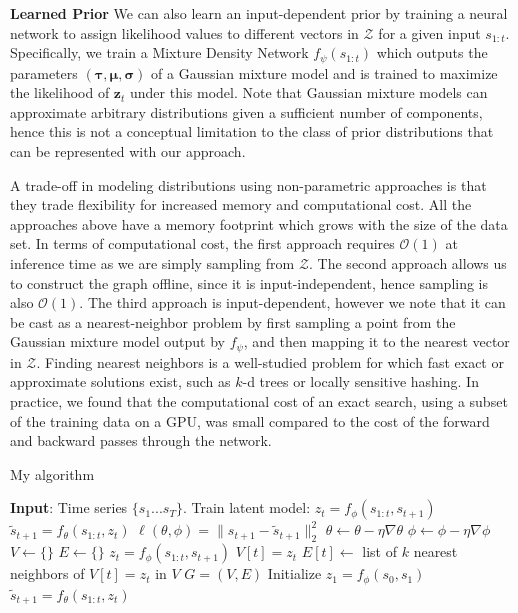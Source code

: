 \documentclass{article}
\begin{document}
\textbf{Learned Prior} \quad
We can also learn an input-dependent prior by training a neural network to assign likelihood values to different vectors in $\mathcal{Z}$ for a given input $s_{1:t}$.
Specifically, we train a Mixture Density Network \citep{mixture-density-networks} $f_\psi(s_{1:t})$ which outputs the parameters $(\bm{\tau}, \bm{\mu}, \bm{\sigma})$ of a Gaussian mixture model and is trained to maximize the likelihood of $\bm{z}_t$ under this model.
Note that Gaussian mixture models can approximate arbitrary distributions given a sufficient number of components, hence this is not a conceptual limitation to the class of prior distributions that can be represented with our approach.

A trade-off in modeling distributions using non-parametric approaches is that they trade flexibility for increased memory and computational cost.
All the approaches above have a memory footprint which grows with the size of the data set.
In terms of computational cost, the first approach requires $\mathcal{O}(1)$ at inference time as we are simply sampling from $\mathcal{Z}$.
The second approach allows us to construct the graph offline, since it is input-independent, hence sampling is also $\mathcal{O}(1)$.
The third approach is input-dependent, however we note that it can be cast as a nearest-neighbor problem by first sampling a point from the Gaussian mixture model output by $f_\psi$, and then mapping it to the nearest vector in $\mathcal{Z}$.
Finding nearest neighbors is a well-studied problem for which fast exact or approximate solutions exist, such as $k$-d trees or locally sensitive hashing.
In practice, we found that the computational cost of an exact search, using a subset of the training data on a GPU, was small compared to the cost of the forward and backward passes through the network.

\begin{algorithm}
  \caption{My algorithm}\label{algo}
  \begin{algorithmic}[1]
    \State \textbf{Input}: Time series $\{s_1...s_T\}$.
    \State Train latent model:
    \State $z_t = f_{\phi}(s_{1:t}, s_{t+1})$
    \State $\tilde{s}_{t+1} = f_{\theta}(s_{1:t}, z_t)$
    \State $\ell(\theta, \phi) = \|s_{t+1} - \tilde{s}_{t+1} \|_2^2$
    \State $\theta \leftarrow \theta - \eta \nabla \theta$
    \State $\phi \leftarrow \phi - \eta \nabla \phi$
    \EndWhile
    \State $V \leftarrow \{ \}$
    \State $E \leftarrow \{ \}$
    \State $z_t = f_{\phi}(s_{1:t}, s_{t+1})$
    \State $V[t] = z_t$
    \EndFor
    \State $E[t] \leftarrow $ list of $k$ nearest neighbors of $V[t] = z_t$ in $V$
    \EndFor
    \Return $G = (V, E)$
    \EndProcedure
    \State Initialize $z_1 = f_{\phi}(s_0, s_1)$
    \State $\tilde{s}_{t+1} = f_{\theta}(s_{1:t}, z_t)$
    \EndFor
    \EndProcedure
  \end{algorithmic}
\end{algorithm}
\end{document}
